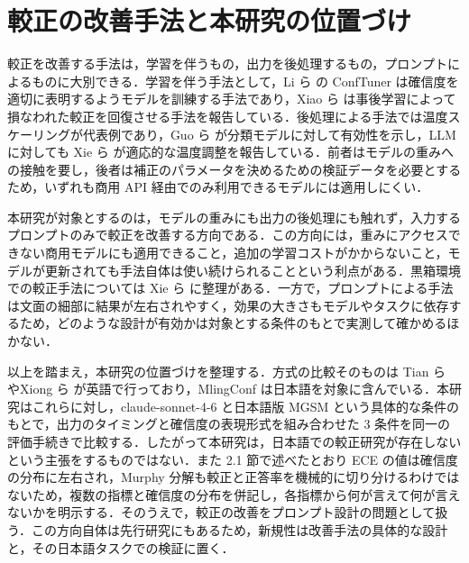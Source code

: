 \section{較正の改善手法と本研究の位置づけ}

較正を改善する手法は，学習を伴うもの，出力を後処理するもの，プロンプトによるものに大別できる．学習を伴う手法として，Li ら \cite{li2025conftuner} の ConfTuner は確信度を適切に表明するようモデルを訓練する手法であり，Xiao ら \cite{xiao2025restoringcalibration} は事後学習によって損なわれた較正を回復させる手法を報告している．後処理による手法では温度スケーリングが代表例であり，Guo ら \cite{guo2017calibration} が分類モデルに対して有効性を示し，LLM に対しても Xie ら \cite{xie2024adaptivetemp} が適応的な温度調整を報告している．前者はモデルの重みへの接触を要し，後者は補正のパラメータを決めるための検証データを必要とするため，いずれも商用 API 経由でのみ利用できるモデルには適用しにくい．

本研究が対象とするのは，モデルの重みにも出力の後処理にも触れず，入力するプロンプトのみで較正を改善する方向である．この方向には，重みにアクセスできない商用モデルにも適用できること，追加の学習コストがかからないこと，モデルが更新されても手法自体は使い続けられることという利点がある．黒箱環境での較正手法については Xie ら \cite{xie2024blackboxsurvey} に整理がある．一方で，プロンプトによる手法は文面の細部に結果が左右されやすく，効果の大きさもモデルやタスクに依存するため，どのような設計が有効かは対象とする条件のもとで実測して確かめるほかない．

以上を踏まえ，本研究の位置づけを整理する．方式の比較そのものは Tian ら \cite{tian2023justask} やXiong ら \cite{xiong2024llmuncertainty} が英語で行っており，MlingConf は日本語を対象に含んでいる．本研究はこれらに対し，claude-sonnet-4-6 と日本語版 MGSM という具体的な条件のもとで，出力のタイミングと確信度の表現形式を組み合わせた 3 条件を同一の評価手続きで比較する．したがって本研究は，日本語での較正研究が存在しないという主張をするものではない．また 2.1 節で述べたとおり ECE の値は確信度の分布に左右され，Murphy 分解も較正と正答率を機械的に切り分けるわけではないため，複数の指標と確信度の分布を併記し，各指標から何が言えて何が言えないかを明示する．そのうえで，較正の改善をプロンプト設計の問題として扱う．この方向自体は先行研究にもあるため，新規性は改善手法の具体的な設計と，その日本語タスクでの検証に置く．
